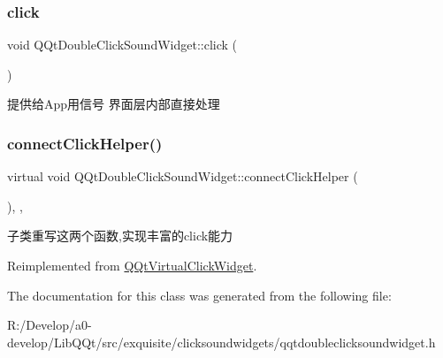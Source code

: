 \subsubsection{\texorpdfstring{click}{click}}
{\footnotesize\ttfamily void Q\+Qt\+Double\+Click\+Sound\+Widget\+::click (\begin{DoxyParamCaption}{ }\end{DoxyParamCaption})\hspace{0.3cm}{\ttfamily [signal]}}

提供给\+App用信号 界面层内部直接处理 \mbox{\label{class_q_qt_double_click_sound_widget_a96be7b2c78a6454f37cf585a18dbd0d9}} 
\subsubsection{\texorpdfstring{connect\+Click\+Helper()}{connectClickHelper()}}
{\footnotesize\ttfamily virtual void Q\+Qt\+Double\+Click\+Sound\+Widget\+::connect\+Click\+Helper (\begin{DoxyParamCaption}{ }\end{DoxyParamCaption})\hspace{0.3cm}{\ttfamily [inline]}, {\ttfamily [protected]}, {\ttfamily [virtual]}}

子类重写这两个函数,实现丰富的click能力 

Reimplemented from \mbox{\hyperlink{class_q_qt_virtual_click_widget_a2e9874c5ec5aba763426dcacb012d7a7}{Q\+Qt\+Virtual\+Click\+Widget}}.



The documentation for this class was generated from the following file\+:\begin{DoxyCompactItemize}
\item 
R\+:/\+Develop/a0-\/develop/\+Lib\+Q\+Qt/src/exquisite/clicksoundwidgets/qqtdoubleclicksoundwidget.\+h\end{DoxyCompactItemize}
